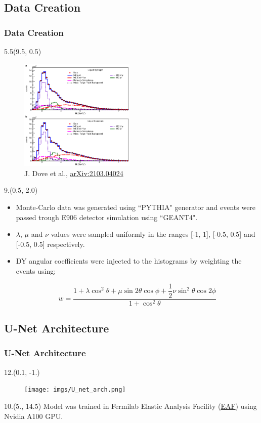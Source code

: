 \documentclass[12pt, xcolor={dvipsnames}, aspectratio = 169, sans, mathserif]{beamer}
\newenvironment{List}[2]
{\begin{textblock}{#1}#2
\begin{itemize}}
{\end{itemize}
\end{textblock}}
\newenvironment{Pic}[2]
{\begin{textblock}{#1}#2
\begin{figure}}
{\end{figure}
\end{textblock}}
\newcommand{\NewCaption}[3]{\caption{{#1}, \textcolor{blue}{\href{#2}{#3}}}}
\begin{document}
\subsection{Data Creation}
\begin{frame}
\frametitle{Data Creation}

\begin{Pic}{5.5}{(9.5, 0.5)}
  \NewCaption{J. Dove et al.}{https://arxiv.org/abs/2103.04024}{arXiv:2103.04024}
  \includegraphics[width=5.5cm]{imgs/mc2real.png}
\end{Pic}

\begin{List}{9.}{(0.5, 2.0)}

  \item Monte-Carlo data was generated using ``PYTHIA" generator and events were passed trough E906 detector simulation using ``GEANT4".

  \item $\lambda$, $\mu$ and $\nu$ values were sampled uniformly in the ranges [-1, 1], [-0.5, 0.5] and [-0.5, 0.5] respectively.

  \item DY angular coefficients were injected to the histograms by weighting the events using;

  \begin{equation*}
w = \frac{1  + \lambda \cos^{2}\theta + \mu \sin 2 \theta \cos \phi + \dfrac{1}{2}\nu \sin^{2}\theta \cos 2 \phi}{1 + \cos^{2}\theta}
  \end{equation*}

\end{List}
\end{frame}

\subsection{U-Net Architecture}

\begin{frame}
\frametitle{U-Net Architecture}

\begin{Pic}{12.}{(0.1, -1.)}
  \texttt{[image: imgs/U\_net\_arch.png]}
\end{Pic}

\begin{textblock}{10.}(5., 14.5)
Model was trained in  Fermilab Elastic Analysis Facility (\textcolor{blue}{\href{https://eafjupyter.readthedocs.io/en/latest/index.html}{EAF}}) using Nvidia A100 GPU.
\end{textblock}

\end{frame}
\end{document}
